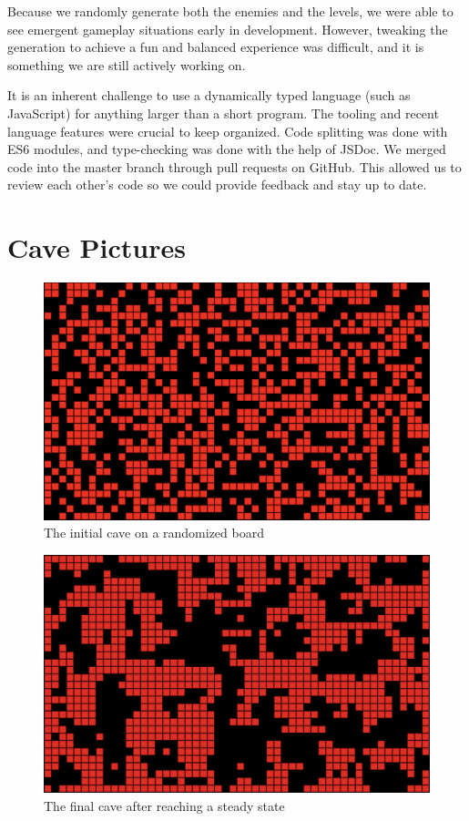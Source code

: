 \documentclass[a4paper, 12pt]{article}
\begin{document}
Because we randomly generate both the enemies and the levels, we were able to
see emergent gameplay situations early in development. However, tweaking the
generation to achieve a fun and balanced experience was difficult, and it is
something we are still actively working on.

It is an inherent challenge to use a dynamically typed language (such as
JavaScript) for anything larger than a short program. The tooling and recent
language features were crucial to keep organized. Code splitting was done with
ES6 modules, and type-checking was done with the help of JSDoc. We merged code
into the master branch through pull requests on GitHub. This allowed us to
review each other's code so we could provide feedback and stay up to date.

\section{Cave Pictures}
\label{sec:cavePictures}

\begin{figure}[h]
	\centering
	\includegraphics[width=\textwidth]{initial-cave.png}
	\caption{The initial cave on a randomized board}
	\label{fig:initialCave}
\end{figure}

\begin{figure}[h]
	\centering
	\includegraphics[width=\textwidth]{one-step-cave.png}
	\caption{The final cave after reaching a steady state}
	\label{fig:oneStepCave}
\end{figure}
\end{document}

